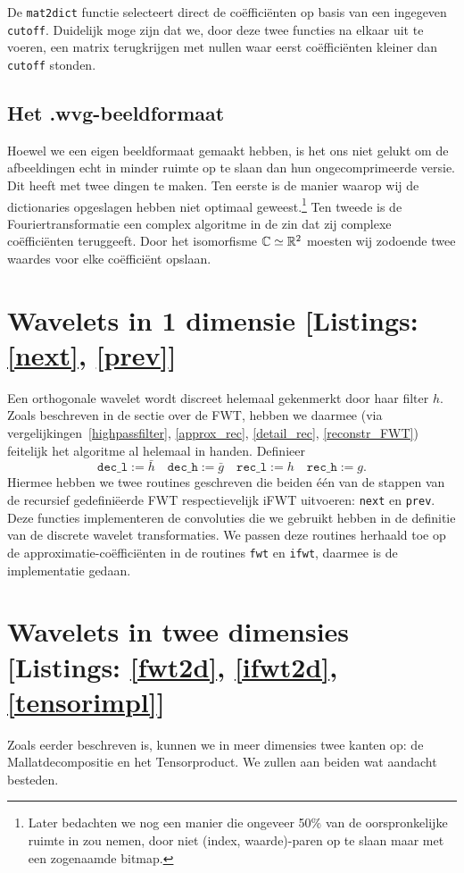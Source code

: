 De \texttt{mat2dict} functie selecteert direct de co\"effici\"enten op basis van een ingegeven \texttt{cutoff}.
Duidelijk moge zijn dat we, door deze twee functies na elkaar uit te voeren, een matrix terugkrijgen met nullen 
waar eerst co\"effici\"enten kleiner dan \texttt{cutoff} stonden.

\subsection{Het .wvg-beeldformaat}
Hoewel we een eigen beeldformaat gemaakt hebben, is het ons niet gelukt om de afbeeldingen echt in minder ruimte op te slaan dan hun ongecomprimeerde versie. Dit heeft met twee dingen te maken. Ten eerste is de manier waarop wij de dictionaries opgeslagen hebben niet optimaal geweest.\footnote{Later bedachten we nog een manier die ongeveer 50\% van de oorspronkelijke ruimte in zou nemen, door niet (index, waarde)-paren op te slaan maar met een zogenaamde bitmap.} Ten tweede is de Fouriertransformatie een complex algoritme in de zin dat zij complexe co\"effici\"enten teruggeeft. Door het isomorfisme $\mathbb{C} \simeq \mathbb{R}^2$ moesten wij zodoende twee waardes voor elke co\"effici\"ent opslaan.

\section{Wavelets in 1 dimensie [Listings: \ref{next}, \ref{prev}]}
Een orthogonale wavelet wordt discreet helemaal gekenmerkt door haar filter $h$. Zoals beschreven in de sectie over de FWT, hebben we daarmee (via vergelijkingen~\ref{highpassfilter}, \ref{approx_rec}, \ref{detail_rec}, \ref{reconstr_FWT}) feitelijk het algoritme al helemaal in handen. Definieer
\[
	\texttt{dec\_l} := \bar{h} \quad \texttt{dec\_h} := \bar{g} \quad 
        \texttt{rec\_l} := h \quad \texttt{rec\_h} := g.
\]
Hiermee hebben we twee routines geschreven die beiden \'e\'en van de stappen van de recursief gedefini\"eerde FWT 
respectievelijk iFWT uitvoeren:
\texttt{next} en \texttt{prev}.
Deze functies implementeren de convoluties die we gebruikt hebben in de definitie van de discrete wavelet transformaties.
We passen deze routines herhaald toe op de approximatie-co\"effici\"enten in de routines \texttt{fwt} en \texttt{ifwt},
daarmee is de implementatie gedaan.

\section{Wavelets in twee dimensies [Listings: \ref{fwt2d}, \ref{ifwt2d}, \ref{tensorimpl}]}
Zoals eerder beschreven is, kunnen we in meer dimensies twee kanten op: de Mallatdecompositie en het Tensorproduct.
We zullen aan beiden wat aandacht besteden.

